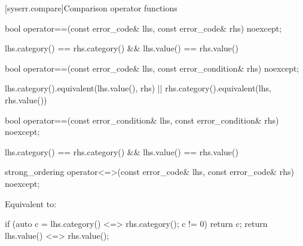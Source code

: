 [syserr.compare]{Comparison operator functions}

%
\begin{itemdecl}
bool operator==(const error_code& lhs, const error_code& rhs) noexcept;
\end{itemdecl}

\begin{itemdescr}
\pnum
\returns
\begin{codeblock}
lhs.category() == rhs.category() && lhs.value() == rhs.value()
\end{codeblock}
\end{itemdescr}

%
%
\begin{itemdecl}
bool operator==(const error_code& lhs, const error_condition& rhs) noexcept;
\end{itemdecl}

\begin{itemdescr}
\pnum
\returns
\begin{codeblock}
lhs.category().equivalent(lhs.value(), rhs) || rhs.category().equivalent(lhs, rhs.value())
\end{codeblock}
\end{itemdescr}

%
\begin{itemdecl}
bool operator==(const error_condition& lhs, const error_condition& rhs) noexcept;
\end{itemdecl}

\begin{itemdescr}
\pnum
\returns
\begin{codeblock}
lhs.category() == rhs.category() && lhs.value() == rhs.value()
\end{codeblock}
\end{itemdescr}

%
\begin{itemdecl}
strong_ordering operator<=>(const error_code& lhs, const error_code& rhs) noexcept;
\end{itemdecl}

\begin{itemdescr}
\pnum
\effects
Equivalent to:
\begin{codeblock}
if (auto c = lhs.category() <=> rhs.category(); c != 0) return c;
return lhs.value() <=> rhs.value();
\end{codeblock}
\end{itemdescr}

